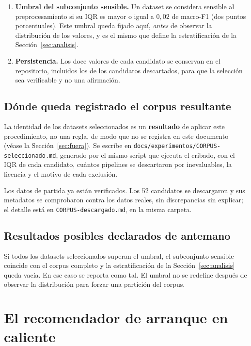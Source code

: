 \documentclass[11pt,letterpaper]{article}
\begin{document}
\begin{enumerate}
  \item \textbf{Umbral del subconjunto sensible.} Un dataset se considera
        sensible al preprocesamiento si su IQR es mayor o igual a $0{,}02$ de
        macro-F1 (dos puntos porcentuales). Este umbral queda fijado aquí,
        \emph{antes} de observar la distribución de los valores, y es el mismo
        que define la estratificación de la Sección~\ref{sec:analisis}.

  \item \textbf{Persistencia.} Los doce valores de cada candidato se conservan en
        el repositorio, incluidos los de los candidatos descartados, para que la
        selección sea verificable y no una afirmación.
\end{enumerate}

\subsection{Dónde queda registrado el corpus resultante}

La identidad de los datasets seleccionados es un \textbf{resultado} de aplicar
este procedimiento, no una regla, de modo que no se registra en este documento
(véase la Sección~\ref{sec:fuera}). Se escribe en
\texttt{docs/experimentos/CORPUS-seleccionado.md}, generado por el mismo script
que ejecuta el cribado, con el IQR de cada candidato, cuántos pipelines se
descartaron por inevaluables, la licencia y el motivo de cada exclusión.

Los datos de partida ya están verificados. Los 52 candidatos se descargaron y sus
metadatos se comprobaron contra los datos reales, sin discrepancias sin explicar;
el detalle está en \texttt{CORPUS-descargado.md}, en la misma carpeta.

\subsection{Resultados posibles declarados de antemano}

Si todos los datasets seleccionados superan el umbral, el subconjunto sensible
coincide con el corpus completo y la estratificación de la
Sección~\ref{sec:analisis} queda vacía. En ese caso se reporta como tal. El
umbral no se redefine después de observar la distribución para forzar una
partición del corpus.

\section{El recomendador de arranque en caliente}
\label{sec:recomendador}
\end{document}
